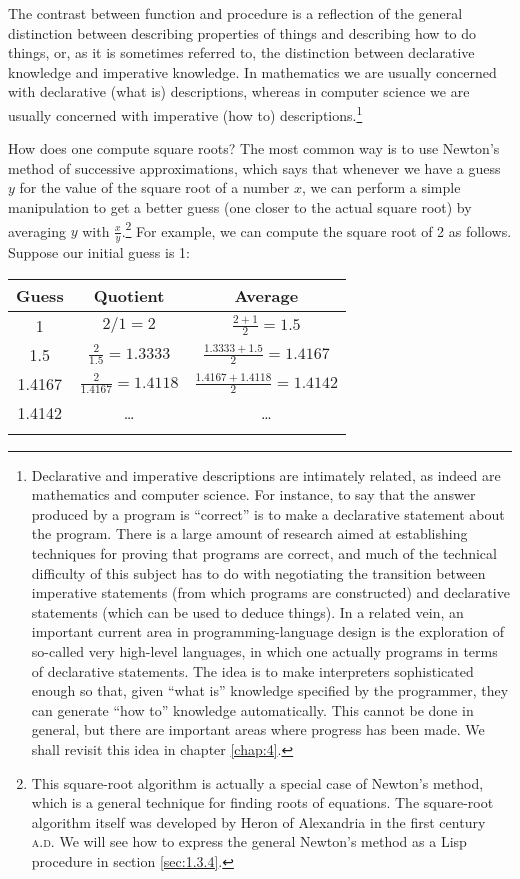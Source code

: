 \begin{schemedisplay}
The contrast between function and procedure is a reflection of the
general distinction between describing properties of things and
describing how to do things, or, as it is sometimes referred to, the
distinction between declarative knowledge and imperative knowledge.
In mathematics we are usually concerned with declarative (what is)
descriptions, whereas in computer science we are usually concerned
with imperative (how to) descriptions.\footnote{ Declarative and
  imperative descriptions are intimately related, as indeed are
  mathematics and computer science.  For instance, to say that the
  answer produced by a program is ``correct'' is to make a declarative
  statement about the program.  There is a large amount of research
  aimed at establishing techniques for proving that programs are
  correct, and much of the technical difficulty of this subject has to
  do with negotiating the transition between imperative statements
  (from which programs are constructed) and declarative statements
  (which can be used to deduce things).  In a related vein, an
  important current area in programming-language design is the
  exploration of so-called very high-level languages, in which one
  actually programs in terms of declarative statements.  The idea is
  to make interpreters sophisticated enough so that, given ``what is''
  knowledge specified by the programmer, they can generate ``how to''
  knowledge automatically.  This cannot be done in general, but there
  are important areas where progress has been made.  We shall revisit
  this idea in chapter \ref{chap:4}.}


How does one compute square roots?  The most common way is to use
Newton's method of successive approximations, which says that whenever
we have a guess $y$ for the value of the square root of a number $x$,
we can perform a simple manipulation to get a better guess (one closer
to the actual square root) by averaging $y$ with
$\frac{x}{y}$.\footnote{This square-root algorithm is actually a
  special case of Newton's method, which is a general technique for
  finding roots of equations.  The square-root algorithm itself was
  developed by Heron of Alexandria in the first century \textsc{a.d}.
  We will see how to express the general Newton's method as a Lisp
  procedure in section \ref{sec:1.3.4}.}  For example, we can compute
the square root of 2 as follows.  Suppose our initial guess is 1:

\begin{tabular}{|c|c|c|}
  \hline{}
  Guess & Quotient & Average \\
  \hline{}
  1 & $2/1 = 2$ & $\frac{2+1}{2} = 1.5$ \\
  1.5 & $\frac{2}{1.5} = 1.3333$ & $\frac{1.3333 + 1.5}{2} = 1.4167$ \\
  1.4167 & $\frac{2}{1.4167} = 1.4118$ & $\frac{1.4167 + 1.4118}{2} = 1.4142$ \\
  1.4142 & \ldots & \ldots \\
  \hline{}
\end{tabular}


\end{schemedisplay}
